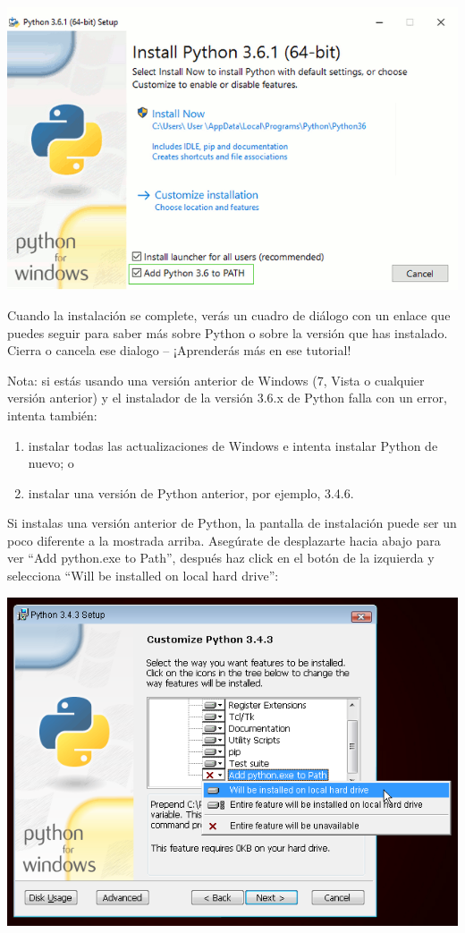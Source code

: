 \documentclass[
  a4paper,
  DIV=11,
  numbers=noendperiod,
  onepage,
  openany]{scrreprt}
\providecommand{\tightlist}{%
  \setlength{\itemsep}{0pt}\setlength{\parskip}{0pt}}\usepackage{longtable,booktabs,array}
\begin{document}
\begin{tcolorbox}
\includegraphics{unidades/unidad1/images/paste-4.png}

Cuando la instalación se complete, verás un cuadro de diálogo con un
enlace que puedes seguir para saber más sobre Python o sobre la versión
que has instalado. Cierra o cancela ese dialogo -- ¡Aprenderás más en
ese tutorial!

Nota: si estás usando una versión anterior de Windows (7, Vista o
cualquier versión anterior) y el instalador de la versión 3.6.x de
Python falla con un error, intenta también:

\begin{enumerate}
\def\labelenumi{\arabic{enumi}.}
\tightlist
\item
  instalar todas las actualizaciones de Windows e intenta instalar
  Python de nuevo; o
\item
  instalar una versión de Python anterior, por ejemplo, 3.4.6.
\end{enumerate}

Si instalas una versión anterior de Python, la pantalla de instalación
puede ser un poco diferente a la mostrada arriba. Asegúrate de
desplazarte hacia abajo para ver ``Add python.exe to Path'', después haz
click en el botón de la izquierda y selecciona ``Will be installed on
local hard drive'':

\includegraphics{unidades/unidad1/images/paste-5.png}

\end{tcolorbox}
\end{document}
